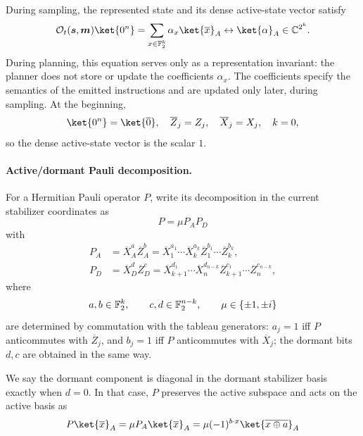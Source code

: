 \documentclass[a4paper,onecolumn,unpublished]{quantumarticle}
\DeclarePairedDelimiter\rbra{\lparen}{\rparen}
\DeclarePairedDelimiter\cbra{\{}{\}}
\newcommand{\cO}{\mathcal{O}}
\newcommand{\CC}{\mathbb{C}}
\newcommand{\FF}{\mathbb{F}}
\begin{document}
During sampling, the represented state and its dense active-state vector satisfy
\begin{equation}\label{eq:active-vector-representation}
    \cO_t\rbra{\bm{s},\bm{m}}\ket{0^n} =
    \sum_{x\in\FF_2^k} \alpha_x\ket{\overline{x}}_A \leftrightarrow
    \ket{\alpha}_A\in\CC^{2^k}.
\end{equation}
During planning, this equation serves only as a representation invariant: the planner does not store or update the coefficients $\alpha_x$.
The coefficients specify the semantics of the emitted instructions and are updated only later, during sampling.
At the beginning,
\begin{equation*}
    \ket{0^n} = \ket{\overline{0}}, \quad \overline{Z}_j = Z_j, \quad \overline{X}_j = X_j, \quad k = 0,
\end{equation*}
so the dense active-state vector is the scalar $1$.

\paragraph{Active/dormant Pauli decomposition.}
For a Hermitian Pauli operator $P$, write its decomposition in the current stabilizer coordinates as
\begin{equation}\label{eq:active-dormant-decomposition}
    P = \mu P_AP_D
\end{equation}
with
\begin{align*}
    P_A &= \overline{X}_A^a\overline{Z}_A^b =
    \overline{X}_1^{a_1}\cdots\overline{X}_k^{a_k} \overline{Z}_1^{b_1}\cdots\overline{Z}_k^{b_k},
    \\
    P_D &= \overline{X}_D^d\overline{Z}_D^c = \overline{X}_{k+1}^{d_1}\cdots\overline{X}_{n}^{d_{n-k}} \overline{Z}_{k+1}^{c_1}\cdots\overline{Z}_{n}^{c_{n-k}},
\end{align*}
where
\begin{equation*}
    a,b\in\FF_2^k,
    \qquad
    c,d\in\FF_2^{n-k},
    \qquad
    \mu\in\cbra{\pm1,\pm i}
\end{equation*}
are determined by commutation with the tableau generators: $a_j=1$ iff $P$ anticommutes with $\overline{Z}_j$, and $b_j=1$ iff $P$ anticommutes with $\overline{X}_j$; the dormant bits $d,c$ are obtained in the same way.

We say the dormant component is diagonal in the dormant stabilizer basis exactly when $d=0$.
In that case, $P$ preserves the active subspace and acts on the active basis as
\begin{equation}\label{eq:active-logical-action}
    P\ket{\overline{x}}_A = \mu P_A \ket{\overline{x}}_A = \mu \rbra{-1}^{b\cdot x}\ket{\overline{x\oplus a}}_A
\end{equation}
\end{document}
